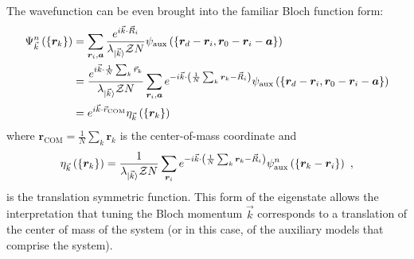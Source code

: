 The wavefunction can be even brought into the familiar Bloch function form:
\begin{equation}\begin{aligned}
	\Psi^n_{\vec k}\left(\left\{{\bm r}_k\right\}\right) &= \sum_{{\bm r}_i, {\bm a}} \frac{e^{i \vec{k}\cdot\vec{R}_i}}{\lambda_{\ket{\vec k}} \mathcal{Z} N} \psi_\text{aux}\left(\left\{ {\bm r}_d - {\bm r}_i, {\bm r_0} - {\bm r}_i - {\bm a} \right\} \right) \\
														 &= \frac{e^{i \vec{k}\cdot\frac{1}{N}\sum_k \vec{r}_k}}{\lambda_{\ket{\vec k}} \mathcal{Z} N}\sum_{{\bm r}_i, {\bm a}} e^{-i \vec{k}\cdot\left(\frac{1}{N}\sum_k{\bm r}_k - \vec{R}_i\right)} \psi_\text{aux}\left(\left\{ {\bm r}_d - {\bm r}_i, {\bm r_0} - {\bm r}_i - {\bm a} \right\} \right) \\
														 &= e^{i \vec{k}\cdot\vec{r}_\text{COM}} \eta_{\vec k}\left(\left\{{\bm r}_k\right\}\right)
\end{aligned}\end{equation}
where \({\bm r}_\text{COM} = \frac{1}{N}\sum_k {\bm r}_k\) is the center-of-mass coordinate and 
\begin{equation}\begin{aligned}
\eta_{\vec k}\left(\left\{{\bm r}_k\right\}\right) = \frac{1}{\lambda_{\ket{\vec k}} \mathcal{Z} N}\sum_{{\bm r}_i} e^{-i \vec{k}\cdot\left(\frac{1}{N}\sum_k{\bm r}_k - \vec{R}_i\right)} \psi^n_\text{aux}\left(\left\{{\bm r}_k - {\bm r}_i\right\}\right)~,
\end{aligned}\end{equation}
is the translation symmetric function. This form of the eigenstate allows the interpretation that tuning the Bloch momentum \(\vec k\) corresponds to a translation of the center of mass of the system (or in this case, of the auxiliary models that comprise the system).

